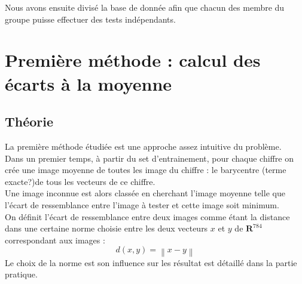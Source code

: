 \documentclass[a4paper,11pt,twoside]{report}
\newcommand{\norm}[1]{\left\lVert#1\right\rVert} %
\begin{document}
Nous avons ensuite divisé la base de donnée afin que chacun des membre du groupe puisse effectuer des tests indépendants. 


\chapter{Première méthode : calcul des écarts à la moyenne} 
\section{Théorie}
La première méthode étudiée est une approche assez intuitive du problème.\\
Dans un premier temps, à partir du set d'entrainement, pour chaque chiffre on crée une image moyenne de toutes les image du chiffre : le barycentre (terme exacte?)de tous les vecteurs de ce chiffre.\\Une image inconnue est alors classée en cherchant l'image moyenne telle que l'écart de ressemblance entre l'image à tester et cette image soit minimum.\\

On définit l'écart de ressemblance entre deux images comme étant la distance dans une certaine norme choisie entre les deux vecteurs $x$ et $y$ de $\textbf{R}^{784}$ correspondant aux images : $$d(x,y) = \norm{x-y}$$ Le choix de la norme est son influence sur les résultat est détaillé dans la partie pratique.
\end{document}
